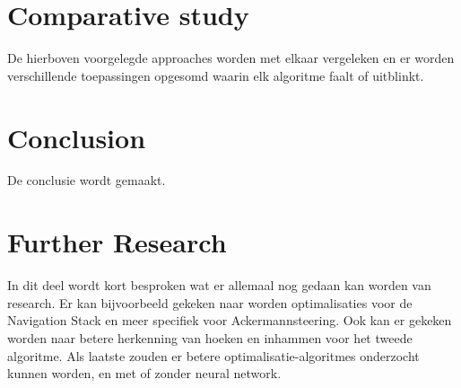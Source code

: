 \documentclass[conference,a4paper]{IEEEtran}
\begin{document}
\section{Comparative study}
De hierboven voorgelegde approaches worden met elkaar vergeleken en er worden verschillende toepassingen opgesomd waarin elk algoritme faalt of uitblinkt.

\section{Conclusion}
De conclusie wordt gemaakt.

\section{Further Research}
In dit deel wordt kort besproken wat er allemaal nog gedaan kan worden van research. Er kan bijvoorbeeld gekeken naar worden optimalisaties voor de Navigation Stack en meer specifiek voor Ackermannsteering. Ook kan er gekeken worden naar betere herkenning van hoeken en inhammen voor het tweede algoritme. Als laatste zouden er betere optimalisatie-algoritmes onderzocht kunnen worden, en met of zonder neural network. 


%
%
%



\newpage


%




\end{document}
